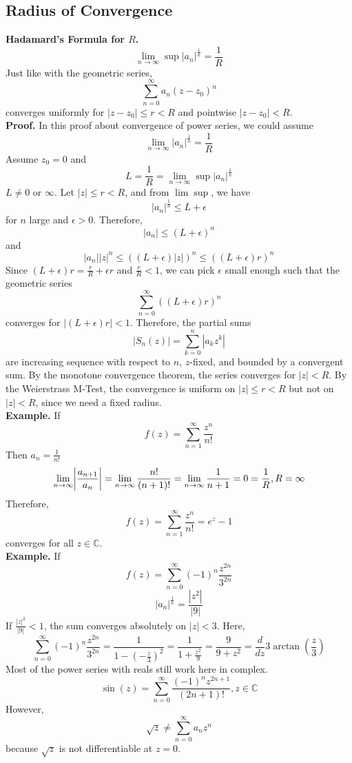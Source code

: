\documentclass[11pt]{article}
\DeclarePairedDelimiter\abs{\lvert}{\rvert}
\begin{document}
\subsection{Radius of Convergence}
\textbf{Hadamard's Formula for $R$.} 
$$\lim_{n\to \infty} \sup|a_n|^{\frac{1}{n}} = \frac{1}{R}$$
Just like with the geometric series, 
$$ \sum_{n = 0}^{\infty} a_n(z - z_0)^n $$
converges uniformly for $|z - z_0| \leqslant r < R$ and pointwise $|z - z_0| < R$. \\
\textbf{Proof.} In this proof about convergence of power series, we could assume 
$$\lim_{n \to \infty} |a_n|^{\frac{1}{n}} = \frac{1}{R}$$
Assume $z_0 = 0$ and 
$$ L = \frac{1}{R} = \lim_{n \to \infty} \sup |a_n|^{\frac{1}{n}}$$
$L \neq 0$ or $\infty$. Let $|z| \leqslant r < R$, and from $\lim \sup$, we have 
$$|a_n|^{\frac{1}{n}} \leqslant L + \epsilon $$
for $n$ large and $\epsilon > 0$. 
Therefore, 
$$ |a_n| \leqslant (L + \epsilon)^n $$
and 
$$ |a_n||z|^n \leqslant ((L + \epsilon)|z|)^n \leqslant ((L + \epsilon)r)^n $$
Since $(L + \epsilon)r = \frac{r}{R} + \epsilon r$ and $\frac{r}{R} < 1$, we can pick $\epsilon$ small enough such that the geometric series 
$$ \sum_{n = 0}^{\infty} ((L + \epsilon)r)^n$$
converges for $|(L + \epsilon)r| < 1$. Therefore, the partial sums 
$$ |S_n(z)| = \sum_{k = 0}^n |a_kz^k|$$
are increasing sequence with respect to $n$, $z$-fixed, and bounded by a convergent sum. By the monotone convergence theorem, the series converges for $|z| < R$. By the Weierstrass M-Test, the convergence is uniform on $|z| \leqslant r < R$ but not on $|z| < R$, since we need a fixed radius. \\
\newline
\textbf{Example.} If 
$$f(z) = \sum_{n = 1}^{\infty} \frac{z^n}{n!} $$
Then $a_n = \frac{1}{n!}$
$$ \lim_{n \to \infty} \abs*{\frac{a_{n + 1}}{a_n}} = \lim_{n \to \infty} \frac{n!}{(n+1)!} = \lim_{n \to \infty} \frac{1}{n + 1} = 0 = \frac{1}{R}, R = \infty$$
Therefore, 
$$ f(z) = \sum_{n = 1}^{\infty} \frac{z^n}{n!} = e^z - 1$$
converges for all $z \in \mathbb{C}$. \\
\newpage
\textbf{Example.} If 
$$ f(z) = \sum_{n = 0}^{\infty} (-1)^n \frac{z^{2n}}{3^{2n}} $$
$$|a_n|^{\frac{1}{n}} = \frac{|z^2|}{|9|} $$
If $\frac{|z|^2}{|9|} < 1$, the sum converges absolutely on $|z| < 3$. Here, 
$$ \sum_{n = 0} ^ {\infty} (-1)^n \frac{z^{2n}}{3^{2n}} = \frac{1}{1 - (-\frac{z}{3})^2} = \frac{1}{1 + \frac{z^2}{9}} = \frac{9}{9 + z^2} = \frac{d}{dz}3\arctan(\frac{z}{3})$$
Most of the power series with reals still work here in complex. 
$$\sin(z) = \sum_{n = 0}^{\infty} \frac{(-1)^nz^{2n + 1}}{(2n + 1)!}, z \in \mathbb{C}$$
However, 
$$ \sqrt{z} \neq \sum_{n = 0}^{\infty} a_nz^n $$ 
because $\sqrt{z}$ is not differentiable at $z = 0$. \\ 
\newline
\end{document}
